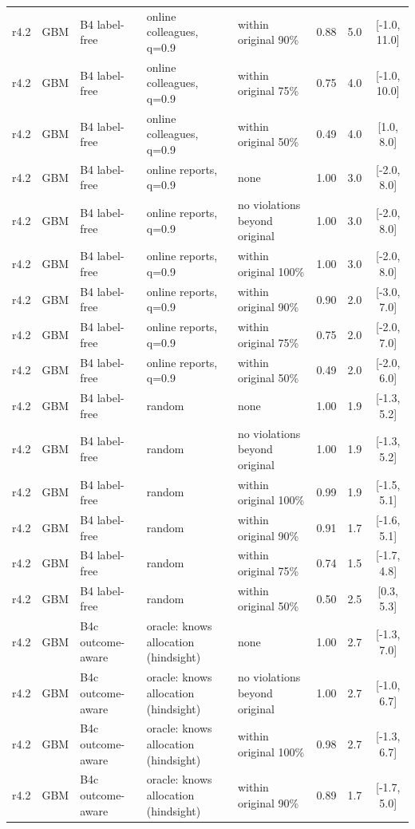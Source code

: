\begin{longtable}{lllp{4.2cm}p{3.4cm}ccc}
r4.2 & GBM & B4 label-free & online colleagues, q=0.9 & within original 90\% & 0.88 & 5.0 & [-1.0, 11.0] \\
r4.2 & GBM & B4 label-free & online colleagues, q=0.9 & within original 75\% & 0.75 & 4.0 & [-1.0, 10.0] \\
r4.2 & GBM & B4 label-free & online colleagues, q=0.9 & within original 50\% & 0.49 & 4.0 & [1.0, 8.0] \\
r4.2 & GBM & B4 label-free & online reports, q=0.9 & none & 1.00 & 3.0 & [-2.0, 8.0] \\
r4.2 & GBM & B4 label-free & online reports, q=0.9 & no violations beyond original & 1.00 & 3.0 & [-2.0, 8.0] \\
r4.2 & GBM & B4 label-free & online reports, q=0.9 & within original 100\% & 1.00 & 3.0 & [-2.0, 8.0] \\
r4.2 & GBM & B4 label-free & online reports, q=0.9 & within original 90\% & 0.90 & 2.0 & [-3.0, 7.0] \\
r4.2 & GBM & B4 label-free & online reports, q=0.9 & within original 75\% & 0.75 & 2.0 & [-2.0, 7.0] \\
r4.2 & GBM & B4 label-free & online reports, q=0.9 & within original 50\% & 0.49 & 2.0 & [-2.0, 6.0] \\
r4.2 & GBM & B4 label-free & random & none & 1.00 & 1.9 & [-1.3, 5.2] \\
r4.2 & GBM & B4 label-free & random & no violations beyond original & 1.00 & 1.9 & [-1.3, 5.2] \\
r4.2 & GBM & B4 label-free & random & within original 100\% & 0.99 & 1.9 & [-1.5, 5.1] \\
r4.2 & GBM & B4 label-free & random & within original 90\% & 0.91 & 1.7 & [-1.6, 5.1] \\
r4.2 & GBM & B4 label-free & random & within original 75\% & 0.74 & 1.5 & [-1.7, 4.8] \\
r4.2 & GBM & B4 label-free & random & within original 50\% & 0.50 & 2.5 & [0.3, 5.3] \\
r4.2 & GBM & B4c outcome-aware & oracle: knows allocation (hindsight) & none & 1.00 & 2.7 & [-1.3, 7.0] \\
r4.2 & GBM & B4c outcome-aware & oracle: knows allocation (hindsight) & no violations beyond original & 1.00 & 2.7 & [-1.0, 6.7] \\
r4.2 & GBM & B4c outcome-aware & oracle: knows allocation (hindsight) & within original 100\% & 0.98 & 2.7 & [-1.3, 6.7] \\
r4.2 & GBM & B4c outcome-aware & oracle: knows allocation (hindsight) & within original 90\% & 0.89 & 1.7 & [-1.7, 5.0] \\

\end{longtable}
